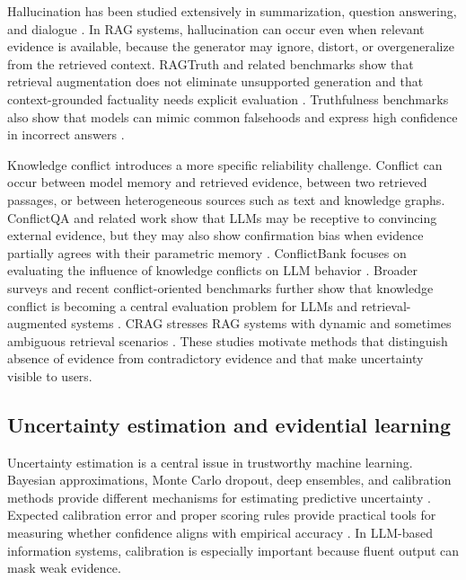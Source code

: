 \documentclass[preprint,12pt,authoryear,nopreprintline]{elsarticle}
\begin{document}
Hallucination has been studied extensively in summarization, question answering, and dialogue \citep{Maynez2020Faithfulness,Ji2023HallucinationSurvey,Manakul2023SelfCheckGPT,Min2023FactScore}. In RAG systems, hallucination can occur even when relevant evidence is available, because the generator may ignore, distort, or overgeneralize from the retrieved context. RAGTruth and related benchmarks show that retrieval augmentation does not eliminate unsupported generation and that context-grounded factuality needs explicit evaluation \citep{Niu2024RAGTruth}. Truthfulness benchmarks also show that models can mimic common falsehoods and express high confidence in incorrect answers \citep{Lin2022TruthfulQA}.

Knowledge conflict introduces a more specific reliability challenge. Conflict can occur between model memory and retrieved evidence, between two retrieved passages, or between heterogeneous sources such as text and knowledge graphs. ConflictQA and related work show that LLMs may be receptive to convincing external evidence, but they may also show confirmation bias when evidence partially agrees with their parametric memory \citep{Xie2024ConflictQA}. ConflictBank focuses on evaluating the influence of knowledge conflicts on LLM behavior \citep{Su2024ConflictBank}. Broader surveys and recent conflict-oriented benchmarks further show that knowledge conflict is becoming a central evaluation problem for LLMs and retrieval-augmented systems \citep{Xu2024KnowledgeConflictsSurvey,Zhao2026ConflictQA,Vergili2024RAGBench}. CRAG stresses RAG systems with dynamic and sometimes ambiguous retrieval scenarios \citep{Yang2024CRAGBenchmark}. These studies motivate methods that distinguish absence of evidence from contradictory evidence and that make uncertainty visible to users.

\subsection{Uncertainty estimation and evidential learning}

Uncertainty estimation is a central issue in trustworthy machine learning. Bayesian approximations, Monte Carlo dropout, deep ensembles, and calibration methods provide different mechanisms for estimating predictive uncertainty \citep{Gal2016Dropout,Lakshminarayanan2017Ensembles,Kendall2017Uncertainties,Ovadia2019TrustUncertainty,Guo2017Calibration}. Expected calibration error and proper scoring rules provide practical tools for measuring whether confidence aligns with empirical accuracy \citep{Gneiting2007ProperScores,Guo2017Calibration}. In LLM-based information systems, calibration is especially important because fluent output can mask weak evidence.
\end{document}
